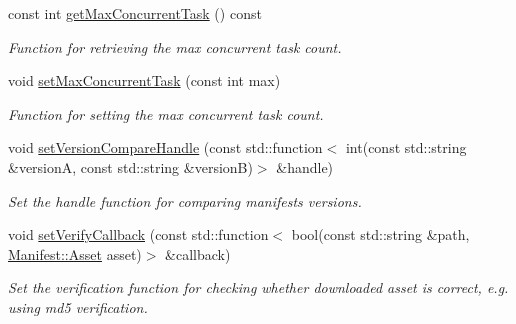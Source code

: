 \begin{DoxyCompactItemize}
\mbox{\label{classAssetsManagerEx_a580fa15596bd99f5d3f66bae33ce53d9}} 
const int \hyperlink{classAssetsManagerEx_a580fa15596bd99f5d3f66bae33ce53d9}{get\+Max\+Concurrent\+Task} () const
\begin{DoxyCompactList}\small\item\em Function for retrieving the max concurrent task count. \end{DoxyCompactList}\item 
\mbox{\label{classAssetsManagerEx_a770b3fb7452f6e9d316dbabb7d9274a4}} 
void \hyperlink{classAssetsManagerEx_a770b3fb7452f6e9d316dbabb7d9274a4}{set\+Max\+Concurrent\+Task} (const int max)
\begin{DoxyCompactList}\small\item\em Function for setting the max concurrent task count. \end{DoxyCompactList}\item 
void \hyperlink{classAssetsManagerEx_a31db300c9b7b7c709f8a312646de5168}{set\+Version\+Compare\+Handle} (const std\+::function$<$ int(const std\+::string \&versionA, const std\+::string \&versionB)$>$ \&handle)
\begin{DoxyCompactList}\small\item\em Set the handle function for comparing manifests versions. \end{DoxyCompactList}\item 
void \hyperlink{classAssetsManagerEx_af16a300f640be0dba1a1b996918b7046}{set\+Verify\+Callback} (const std\+::function$<$ bool(const std\+::string \&path, \hyperlink{structManifest_1_1Asset}{Manifest\+::\+Asset} asset)$>$ \&callback)
\begin{DoxyCompactList}\small\item\em Set the verification function for checking whether downloaded asset is correct, e.\+g. using md5 verification. \end{DoxyCompactList}\end{DoxyCompactItemize}

